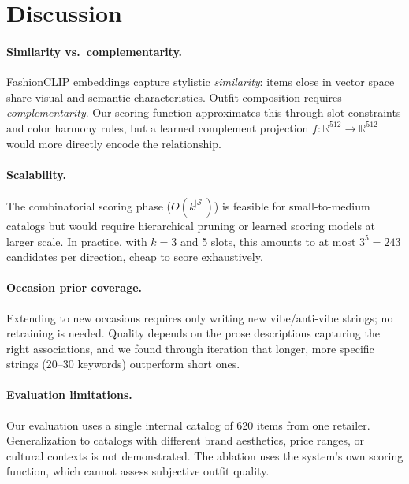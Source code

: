\documentclass[10pt,twocolumn]{article}
\begin{document}
\section{Discussion}
\label{sec:discussion}

\paragraph{Similarity vs.\ complementarity.}
FashionCLIP embeddings capture stylistic \emph{similarity}: items close in
vector space share visual and semantic characteristics.  Outfit composition
requires \emph{complementarity}.  Our scoring function approximates this
through slot constraints and color harmony rules, but a learned complement
projection $f: \mathbb{R}^{512} \to \mathbb{R}^{512}$ would more directly
encode the relationship.

\paragraph{Scalability.}
The combinatorial scoring phase ($O(k^{|\mathcal{S}|})$) is feasible for
small-to-medium catalogs but would require hierarchical pruning or learned
scoring models at larger scale.  In practice, with $k{=}3$ and 5 slots,
this amounts to at most $3^5 = 243$ candidates per direction, cheap to
score exhaustively.

\paragraph{Occasion prior coverage.}
Extending to new occasions requires only writing new vibe/anti-vibe
strings; no retraining is needed.  Quality depends on the prose descriptions capturing
the right associations, and we found through iteration that longer, more
specific strings (20--30 keywords) outperform short ones.

\paragraph{Evaluation limitations.}
Our evaluation uses a single internal catalog of 620 items from one
retailer.  Generalization to catalogs with different brand aesthetics,
price ranges, or cultural contexts is not demonstrated.  The ablation
uses the system's own scoring function, which cannot assess subjective
outfit quality.
\end{document}
